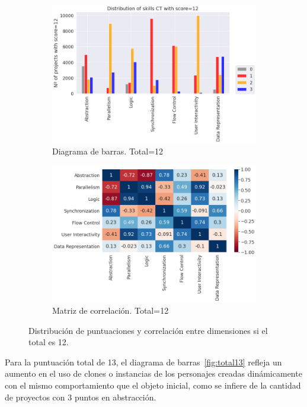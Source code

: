 \documentclass[a4paper, 12pt]{book}
\begin{document}
\begin{figure}
    \centering
    \begin{subfigure}[h]{.49\textwidth} 
        \includegraphics[width=\textwidth]{img/distribucion_12_Scratch}
        \caption{Diagrama de barras. Total=12}
        \label{fig:total12}
    \end{subfigure}       
    \begin{subfigure}[h]{.49\textwidth} 
        \includegraphics[width=\textwidth]{img/corr_12_Scratch}
        \caption{Matriz de correlación. Total=12}
        \label{fig:corr12}
    \end{subfigure}
     \caption{Distribución de puntuaciones y correlación entre dimensiones si el total es 12.}
\end{figure}

Para la puntuación total de 13, el diagrama de barras~\ref{fig:total13} refleja un aumento en el uso de clones o instancias de los personajes creadas dinámicamente con el mismo comportamiento que el objeto inicial, como se infiere de la cantidad de proyectos con 3 puntos en abstracción.
\end{document}
